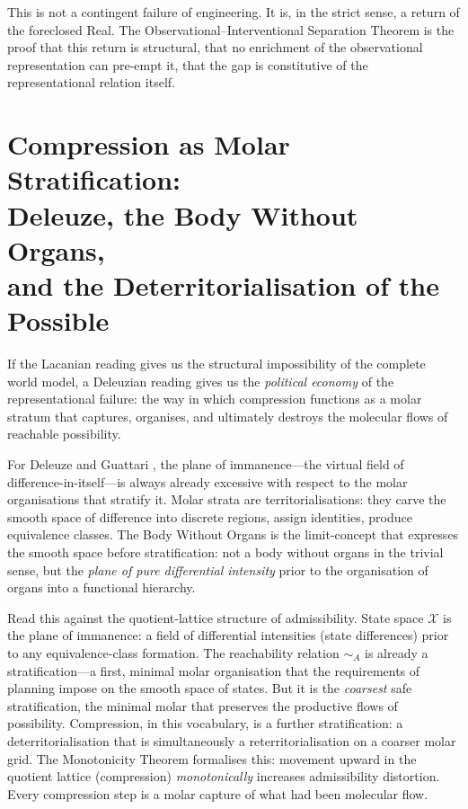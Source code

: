 \documentclass[10pt,a4paper]{article}
\begin{document}
This is not a contingent failure of engineering. It is, in the strict sense,
a return of the foreclosed Real. The Observational--Interventional Separation
Theorem is the proof that this return is structural, that no enrichment of the
observational representation can pre-empt it, that the gap is constitutive of
the representational relation itself.

\section{Compression as Molar Stratification:\\
Deleuze, the Body Without Organs,\\
and the Deterritorialisation of the Possible}

If the Lacanian reading gives us the structural impossibility of the complete
world model, a Deleuzian reading gives us the \emph{political economy} of the
representational failure: the way in which compression functions as a molar
stratum that captures, organises, and ultimately destroys the molecular flows
of reachable possibility.

For Deleuze and Guattari \citeyearpar{deleuze1987thousand}, the plane of
immanence---the virtual field of difference-in-itself---is always already
excessive with respect to the molar organisations that stratify it. Molar
strata are territorialisations: they carve the smooth space of difference into
discrete regions, assign identities, produce equivalence classes. The Body
Without Organs is the limit-concept that expresses the smooth space before
stratification: not a body without organs in the trivial sense, but the
\emph{plane of pure differential intensity} prior to the organisation of organs
into a functional hierarchy.

Read this against the quotient-lattice structure of admissibility. State space
$\mathcal{X}$ is the plane of immanence: a field of differential intensities
(state differences) prior to any equivalence-class formation. The reachability
relation $\sim_A$ is already a stratification---a first, minimal molar
organisation that the requirements of planning impose on the smooth space of
states. But it is the \emph{coarsest} safe stratification, the minimal molar
that preserves the productive flows of possibility. Compression, in this
vocabulary, is a further stratification: a deterritorialisation that is
simultaneously a reterritorialisation on a coarser molar grid. The Monotonicity
Theorem formalises this: movement upward in the quotient lattice (compression)
\emph{monotonically} increases admissibility distortion. Every compression step
is a molar capture of what had been molecular flow.
\end{document}
